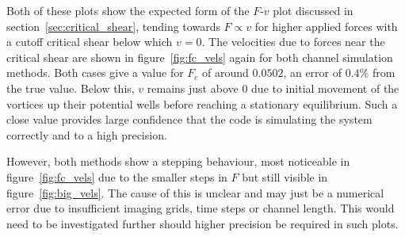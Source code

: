 \documentclass{article}
\numberwithin{equation}{section}
\begin{document}
Both of these plots show the expected form of the $F$-$v$ plot discussed in section~\ref{sec:critical_shear}, tending towards $F\propto v$ for higher applied forces with a cutoff critical shear below which $v=0$. The velocities due to forces near the critical shear are shown in figure~\ref{fig:fc_vels} again for both channel simulation methods. Both cases give a value for $F_c$ of around $0.0502$, an error of $0.4\%$ from the true value. Below this, $v$ remains just above $0$ due to initial movement of the vortices up their potential wells before reaching a stationary equilibrium. Such a close value provides large confidence that the code is simulating the system correctly and to a high precision.

However, both methods show a stepping behaviour, most noticeable in figure~\ref{fig:fc_vels} due to the smaller steps in $F$ but still visible in figure~\ref{fig:big_vels}. The cause of this is unclear and may just be a numerical error due to insufficient imaging grids, time steps or channel length. This would need to be investigated further should higher precision be required in such plots.
\end{document}
